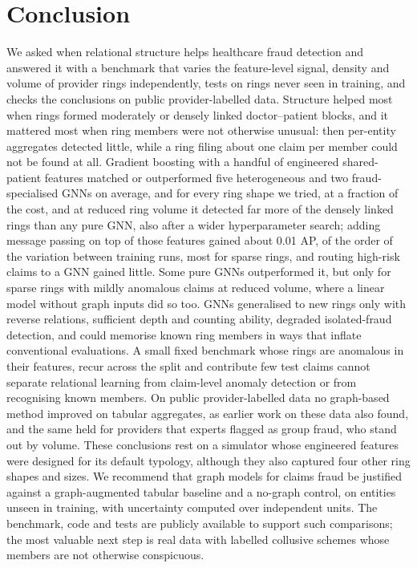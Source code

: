 \documentclass[pdflatex,sn-vancouver-num]{sn-jnl}
\begin{document}
\section{Conclusion}\label{sec:conclusion}
We asked when relational structure helps healthcare fraud detection and
answered it with a benchmark that varies the feature-level signal, density
and volume of provider rings independently, tests on rings never seen in
training, and checks the conclusions on public provider-labelled data.
Structure helped most when rings formed moderately or densely linked
doctor--patient blocks, and it mattered most when ring members were not
otherwise unusual: then per-entity aggregates detected little, while a ring
filing about one claim per member could not be found at all. Gradient
boosting with a handful of engineered shared-patient features matched or
outperformed five heterogeneous and two fraud-specialised GNNs on average, and
for every ring shape we tried, at a fraction of the cost,
and at reduced ring volume it detected far more of the densely linked rings
than any pure GNN, also after a wider hyperparameter search;
adding message passing on top of those features gained about 0.01 AP, of the
order of the variation between training runs, most for sparse rings, and
routing high-risk claims to a GNN gained little. Some pure GNNs outperformed
it, but only for sparse rings with mildly anomalous claims at reduced volume, where a
linear model without graph inputs did so too. GNNs
generalised to new rings only with reverse relations, sufficient depth and
counting ability, degraded isolated-fraud detection, and could memorise known
ring members in ways that inflate conventional evaluations. A small fixed
benchmark whose rings are anomalous in their features, recur across the split
and contribute few test claims cannot separate relational learning from
claim-level anomaly detection or from recognising known members. On public
provider-labelled data no graph-based method improved on tabular aggregates,
as earlier work on these data also found, and the same held for providers that
experts flagged as group fraud, who stand out by volume. These conclusions rest on a
simulator whose engineered features were designed for its default typology,
although they also captured four other ring shapes and sizes. We
recommend that graph models for claims fraud be justified against a
graph-augmented tabular baseline and a no-graph control, on entities unseen
in training, with uncertainty computed over independent units. The
benchmark, code and tests are publicly available to support such
comparisons; the most valuable next step is real data with labelled
collusive schemes whose members are not otherwise conspicuous.
\end{document}
